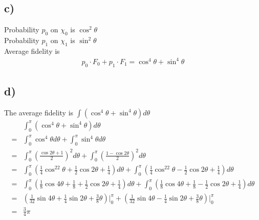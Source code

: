\subsection*{c)}
Probability $p_0$ on $\chi_0$ is $\cos^2\theta$\\
Probability $p_1$ on $\chi_1$ is $\sin^2\theta$\\
Average fidelity is
\begin{align*}
    p_0\cdot F_0 + p_1\cdot F_1 = \cos^4\theta + \sin^4\theta
\end{align*}

\subsection*{d)}
The average fidelity is $\int(\cos^4\theta + \sin^4\theta) d\theta $
\begin{align*}
     &\int_0^\pi(\cos^4\theta + \sin^4\theta)d\theta \\
    =&\int_0^\pi\cos^4\theta d\theta + \int_0^\pi\sin^4\theta d\theta \\
    =&\int_0^\pi(\frac{\cos2\theta + 1}{2})^2d\theta + \int_0^\pi(\frac{1 - \cos2\theta}{2})^2d\theta \\
    =&\int_0^\pi(\frac{1}{4}\cos^22\theta + \frac{1}{2}\cos2\theta + \frac{1}{4})d\theta
    + \int_0^\pi(\frac{1}{4}\cos^22\theta - \frac{1}{2}\cos2\theta + \frac{1}{4})d\theta \\
    =&\int_0^\pi(\frac{1}{8}\cos4\theta + \frac{1}{8} + \frac{1}{2}\cos2\theta + \frac{1}{4})d\theta 
    + \int_0^\pi(\frac{1}{8}\cos4\theta + \frac{1}{8} - \frac{1}{2}\cos2\theta + \frac{1}{4})d\theta \\
    =&(\frac{1}{32}\sin4\theta + \frac{1}{4}\sin2\theta + \frac{3}{8}\theta)\bigg|_0^\pi
    + (\frac{1}{32}\sin4\theta - \frac{1}{4}\sin2\theta + \frac{3}{8}\theta)\bigg|_0^\pi \\
    =&\frac{3}{4}\pi
\end{align*}
